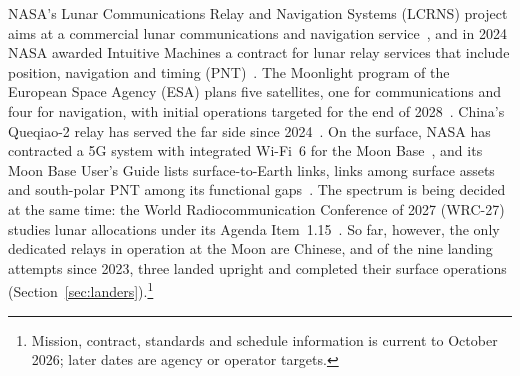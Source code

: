 \documentclass{IEEEoj}
\begin{document}
NASA's Lunar Communications Relay and Navigation Systems (LCRNS) project aims at a commercial lunar communications and navigation service~\cite{lcrns_esper2025}, and in 2024 NASA awarded Intuitive Machines a contract for lunar relay services that include position, navigation and timing (PNT)~\cite{nasa_im_contract}. The Moonlight program of the European Space Agency (ESA) plans five satellites, one for communications and four for navigation, with initial operations targeted for the end of 2028~\cite{esa_moonlight_overview,esa_moonlight_csc}. China's Queqiao-2 relay has served the far side since 2024~\cite{cnsa_queqiao2}. On the surface, NASA has contracted a 5G system with integrated Wi-Fi~6 for the Moon Base~\cite{nasa_c26014}, and its Moon Base User's Guide lists surface-to-Earth links, links among surface assets and south-polar PNT among its functional gaps~\cite{nasa_moonbase_ug2026}. The spectrum is being decided at the same time: the World Radiocommunication Conference of 2027 (WRC-27) studies lunar allocations under its Agenda Item~1.15~\cite{wrc27_ai115}. So far, however, the only dedicated relays in operation at the Moon are Chinese, and of the nine landing attempts since 2023, three landed upright and completed their surface operations (Section~\ref{sec:landers}).\footnote{Mission, contract, standards and schedule information is current to October 2026; later dates are agency or operator targets.}
\end{document}
